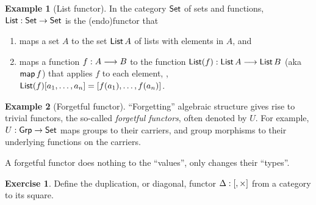 \documentclass[a4paper,fleqn]{scrartcl}
\theoremstyle{definition}
\newtheorem{example}{Example}
\newtheorem{exercise}{Exercise}
\let\C\relax %
\newcommand{\C}{\mathcal{C}}
\begin{document}
\begin{example}[List functor]
  In the category $\mathsf{Set}$ of sets and functions, $\mathsf{List} : \mathsf{Set} \to
  \mathsf{Set}$ is the (endo)functor that
  \begin{enumerate}
  \item maps a set $A$ to the set $\mathsf{List}\,A$ of lists with elements in
    $A$, and
  \item maps a function $f : A \longrightarrow B$ to the function $\mathsf{List}(f) :
    \mathsf{List}\,A \longrightarrow \mathsf{List}\,B$ (aka $\mathsf{map}\,f$)
    that applies $f$ to each element, \ie,
    $\mathsf{List}(f)[a_1,\dots,a_n] = [f(a_1),\dots,f(a_n)]$.
  \end{enumerate}
\end{example}
\begin{example}[Forgetful functor]
  ``Forgetting'' algebraic structure gives rise to trivial functors,
  the so-called \emph{forgetful functors}, often denoted by $U$.  For
  example, $U : \mathsf{Grp} \to \mathsf{Set}$ maps groups to their carriers, and
  group morphisms to their underlying functions on the carriers.

  A forgetful functor does nothing to the ``values'', only changes
  their ``types''.
\end{example}
\begin{exercise}
  Define the duplication, or diagonal, functor $\Dup : [\C,\C \times \C]$
  from a category to its square.
\end{exercise}
\end{document}
